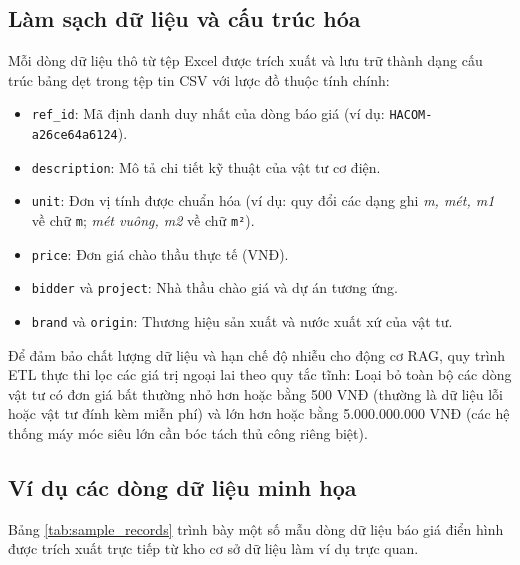 \subsection{Làm sạch dữ liệu và cấu trúc hóa}
Mỗi dòng dữ liệu thô từ tệp Excel được trích xuất và lưu trữ thành dạng cấu trúc bảng dẹt trong tệp tin CSV với lược đồ thuộc tính chính:
\begin{itemize}
    \item \texttt{ref\_id}: Mã định danh duy nhất của dòng báo giá (ví dụ: \texttt{HACOM-a26ce64a6124}).
    \item \texttt{description}: Mô tả chi tiết kỹ thuật của vật tư cơ điện.
    \item \texttt{unit}: Đơn vị tính được chuẩn hóa (ví dụ: quy đổi các dạng ghi \textit{m, mét, m1} về chữ \texttt{m}; \textit{mét vuông, m2} về chữ \texttt{m²}).
    \item \texttt{price}: Đơn giá chào thầu thực tế (VNĐ).
    \item \texttt{bidder} và \texttt{project}: Nhà thầu chào giá và dự án tương ứng.
    \item \texttt{brand} và \texttt{origin}: Thương hiệu sản xuất và nước xuất xứ của vật tư.
\end{itemize}

Để đảm bảo chất lượng dữ liệu và hạn chế độ nhiễu cho động cơ RAG, quy trình ETL thực thi lọc các giá trị ngoại lai theo quy tắc tĩnh: Loại bỏ toàn bộ các dòng vật tư có đơn giá bất thường nhỏ hơn hoặc bằng 500 VNĐ (thường là dữ liệu lỗi hoặc vật tư đính kèm miễn phí) và lớn hơn hoặc bằng 5.000.000.000 VNĐ (các hệ thống máy móc siêu lớn cần bóc tách thủ công riêng biệt).

\subsection{Ví dụ các dòng dữ liệu minh họa}
Bảng \ref{tab:sample_records} trình bày một số mẫu dòng dữ liệu báo giá điển hình được trích xuất trực tiếp từ kho cơ sở dữ liệu làm ví dụ trực quan.

